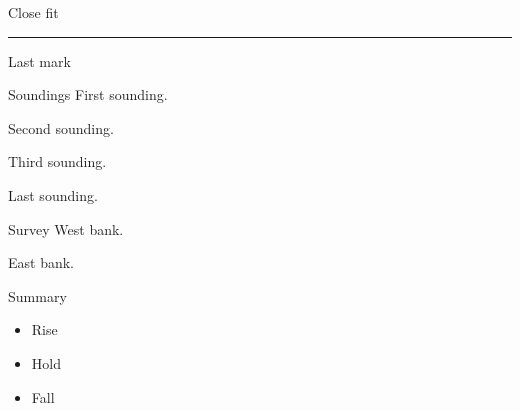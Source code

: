 \documentclass{beamer}
\begin{document}
\begin{frame}{Close fit}
\rule{1mm}{.88\paperheight} Last mark
\end{frame}
\begin{frame}{Soundings}
First sounding.\par\vspace{28mm}
Second sounding.\par\vspace{28mm}
Third sounding.\par\vspace{28mm}
Last sounding.
\end{frame}
\begin{frame}[allowframebreaks]{Survey}
West bank.\par\framebreak East bank.
\end{frame}
\begin{frame}[shrink=15,squeeze]{Summary}
\begin{itemize}\item Rise\item Hold\item Fall\end{itemize}
\end{frame}
\end{document}
